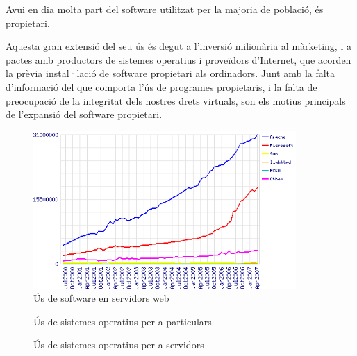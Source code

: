 	Avui en dia molta part del software utilitzat per la majoria de població, és propietari.

	Aquesta gran extensió del seu ús és degut a l'inversió milionària al màrketing, i a
	pactes amb productors de sistemes operatius i proveïdors d'Internet, que acorden la
	prèvia instal·lació de software propietari als ordinadors. Junt amb la falta d'informació del que 
	comporta l'ús de programes propietaris, i la falta de preocupació de la integritat dels
	nostres drets virtuals, son els motius principals de l'expansió del software propietari.

	\begin{figure}[ht!]
	\centering
	\includegraphics[width=100mm]{data/web_servers_share.png}
	\caption{Ús de software en servidors web \cite{whyfoss}}
	\label{websshare}
	\end{figure}

	\begin{figure}[h!]
	\centering
	\caption{Ús de sistemes operatius per a particulars \cite{osstats}}
	\label{osshare}
	\end{figure}

	\begin{figure}[h!]
	\centering
	\caption{Ús de sistemes operatius per a servidors \cite{ossvstats}}
	\label{ossvshare}
	\end{figure}

